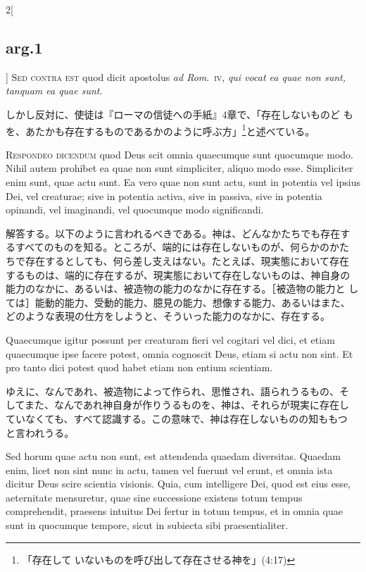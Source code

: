 \documentclass[paper=a4paper,fontsize=10pt,jafontsize=9pt,titlepage]{jlreq}
\begin{document}
\begin{paracol}{2}[\subsection{arg.1}]
{\scshape Sed contra est} quod dicit apostolus {\itshape ad
Rom}.~{\scshape iv}, {\itshape qui vocat ea quae non sunt, tanquam ea
quae sunt}.

\switchcolumn

しかし反対に、使徒は『ローマの信徒への手紙』4章で、「存在しないものど
もを、あたかも存在するものであるかのように呼ぶ方」\footnote{「存在して
いないものを呼び出して存在させる神を」(4:17)}と述べている。


{\scshape Respondeo dicendum} quod Deus scit omnia quaecumque sunt
quocumque modo. Nihil autem prohibet ea quae non sunt simpliciter,
aliquo modo esse. Simpliciter enim sunt, quae actu sunt. Ea vero quae
non sunt actu, sunt in potentia vel ipsius Dei, vel creaturae; sive in
potentia activa, sive in passiva, sive in potentia opinandi, vel
imaginandi, vel quocumque modo significandi.

\switchcolumn

解答する。以下のように言われるべきである。神は、どんなかたちでも存在す
るすべてのものを知る。ところが、端的には存在しないものが、何らかのかた
ちで存在するとしても、何ら差し支えはない。たとえば、現実態において存在
するものは、端的に存在するが、現実態において存在しないものは、神自身の
能力のなかに、あるいは、被造物の能力のなかに存在する。［被造物の能力と
しては］能動的能力、受動的能力、臆見の能力、想像する能力、あるいはまた、
どのような表現の仕方をしようと、そういった能力のなかに、存在する。

\switchcolumn*

Quaecumque igitur possunt per creaturam fieri vel cogitari vel dici,
et etiam quaecumque ipse facere potest, omnia cognoscit Deus, etiam si
actu non sint. Et pro tanto dici potest quod habet etiam non entium
scientiam.

\switchcolumn

ゆえに、なんであれ、被造物によって作られ、思惟され、語られうるもの、そ
してまた、なんであれ神自身が作りうるものを、神は、それらが現実に存在し
ていなくても、すべて認識する。この意味で、神は存在しないものの知ももつ
と言われうる。

\switchcolumn*

Sed horum quae actu non sunt, est attendenda quaedam diversitas.
Quaedam enim, licet non sint nunc in actu, tamen vel fuerunt vel
erunt, et omnia ista dicitur Deus scire scientia visionis. Quia, cum
intelligere Dei, quod est eius esse, aeternitate mensuretur, quae sine
successione existens totum tempus comprehendit, praesens intuitus Dei
fertur in totum tempus, et in omnia quae sunt in quocumque tempore,
sicut in subiecta sibi praesentialiter.


\end{paracol}
\end{document}
